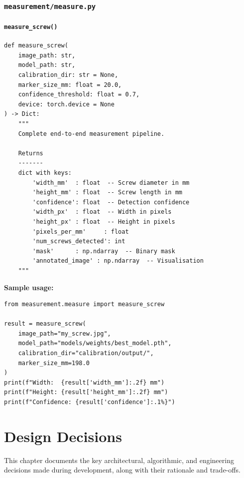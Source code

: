 \documentclass[12pt, a4paper, twoside]{report}
\begin{document}
\subsection{\texttt{measurement/measure.py}}

\subsubsection{\texttt{measure\_screw()}}
\begin{lstlisting}[style=pythonstyle]
def measure_screw(
    image_path: str,
    model_path: str,
    calibration_dir: str = None,
    marker_size_mm: float = 20.0,
    confidence_threshold: float = 0.7,
    device: torch.device = None
) -> Dict:
    """
    Complete end-to-end measurement pipeline.

    Returns
    -------
    dict with keys:
        'width_mm'  : float  -- Screw diameter in mm
        'height_mm' : float  -- Screw length in mm
        'confidence': float  -- Detection confidence
        'width_px'  : float  -- Width in pixels
        'height_px' : float  -- Height in pixels
        'pixels_per_mm'     : float
        'num_screws_detected': int
        'mask'      : np.ndarray  -- Binary mask
        'annotated_image' : np.ndarray  -- Visualisation
    """
\end{lstlisting}

\textbf{Sample usage:}
\begin{lstlisting}[style=pythonstyle]
from measurement.measure import measure_screw

result = measure_screw(
    image_path="my_screw.jpg",
    model_path="models/weights/best_model.pth",
    calibration_dir="calibration/output/",
    marker_size_mm=198.0
)
print(f"Width:  {result['width_mm']:.2f} mm")
print(f"Height: {result['height_mm']:.2f} mm")
print(f"Confidence: {result['confidence']:.1%}")
\end{lstlisting}


\chapter{Design Decisions}
\label{ch:decisions}

This chapter documents the key architectural, algorithmic, and engineering decisions made during development, along with their rationale and trade-offs.
\end{document}
